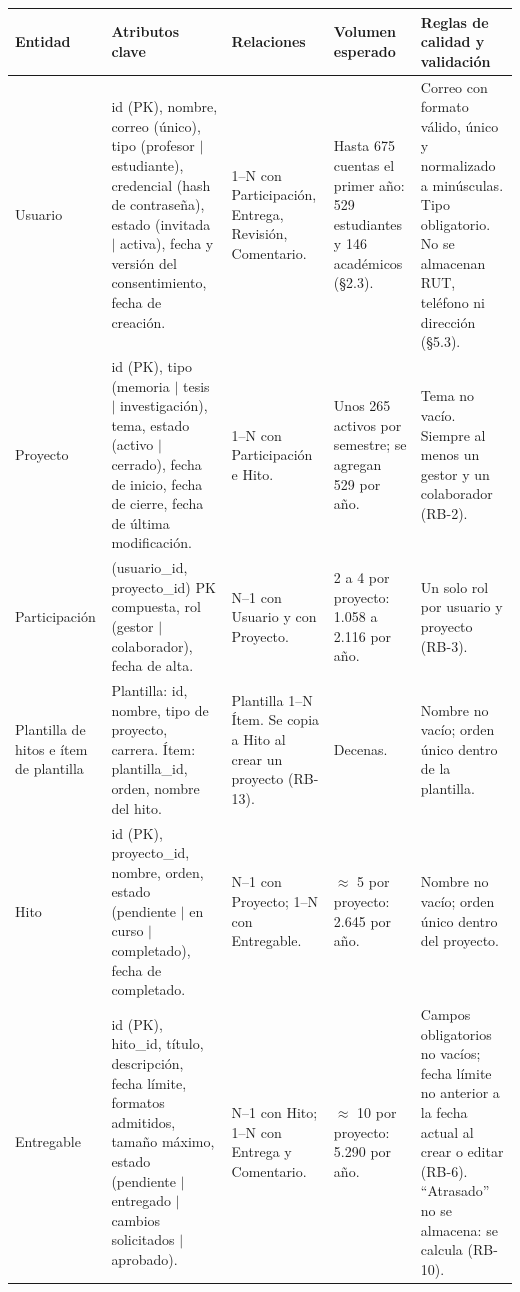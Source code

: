 \documentclass[10pt,a4paper]{article}
\newcommand{\hrow}{\rowcolor{encabezado}}
\newcommand{\h}[1]{\textbf{#1}}
\begin{document}
\begin{xltabular}{\linewidth}{|P{2.4cm}|L|P{2.9cm}|P{2.4cm}|P{3.4cm}|}
\hline\hrow \h{Entidad} & \h{Atributos clave} & \h{Relaciones} & \h{Volumen esperado} & \h{Reglas de calidad y validación} \\ \hline
\endhead
Usuario & id (PK), nombre, correo (único), tipo (profesor $|$ estudiante), credencial (hash de contraseña), estado (invitada $|$ activa), fecha y versión del consentimiento, fecha de creación. & 1–N con Participación, Entrega, Revisión, Comentario. & Hasta 675 cuentas el primer año: 529 estudiantes y 146 académicos (§2.3). & Correo con formato válido, único y normalizado a minúsculas. Tipo obligatorio. No se almacenan RUT, teléfono ni dirección (§5.3). \\ \hline

Proyecto & id (PK), tipo (memoria $|$ tesis $|$ investigación), tema, estado (activo $|$ cerrado), fecha de inicio, fecha de cierre, fecha de última modificación. & 1–N con Participación e Hito. & Unos 265 activos por semestre; se agregan 529 por año. & Tema no vacío. Siempre al menos un gestor y un colaborador (RB-2). \\ \hline

Participación & (usuario\_id, proyecto\_id) PK compuesta, rol (gestor $|$ colaborador), fecha de alta. & N–1 con Usuario y con Proyecto. & 2 a 4 por proyecto: 1.058 a 2.116 por año. & Un solo rol por usuario y proyecto (RB-3). \\ \hline

Plantilla de hitos e ítem de plantilla & Plantilla: id, nombre, tipo de proyecto, carrera. Ítem: plantilla\_id, orden, nombre del hito. & Plantilla 1–N Ítem. Se copia a Hito al crear un proyecto (RB-13). & Decenas. & Nombre no vacío; orden único dentro de la plantilla. \\ \hline

Hito & id (PK), proyecto\_id, nombre, orden, estado (pendiente $|$ en curso $|$ completado), fecha de completado. & N–1 con Proyecto; 1–N con Entregable. & $\approx$ 5 por proyecto: 2.645 por año. & Nombre no vacío; orden único dentro del proyecto. \\ \hline

Entregable & id (PK), hito\_id, título, descripción, fecha límite, formatos admitidos, tamaño máximo, estado (pendiente $|$ entregado $|$ cambios solicitados $|$ aprobado). & N–1 con Hito; 1–N con Entrega y Comentario. & $\approx$ 10 por proyecto: 5.290 por año. & Campos obligatorios no vacíos; fecha límite no anterior a la fecha actual al crear o editar (RB-6). ``Atrasado'' no se almacena: se calcula (RB-10). \\ \hline


\end{xltabular}
\end{document}
